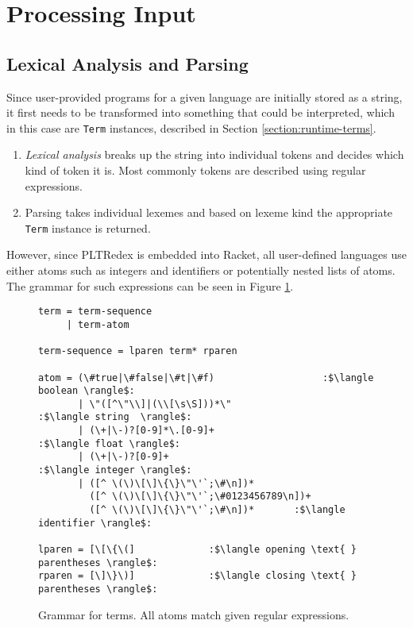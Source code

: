 \section{Processing Input}
\label{section:lex-parse}

\subsection{Lexical Analysis and Parsing}
Since user-provided programs for a given language are initially stored as a string, it first needs to be transformed into something that could be interpreted, which in this case are \texttt{Term} instances, described in Section \ref{section:runtime-terms}. 

\begin{enumerate}
\item
\textit{Lexical analysis} breaks up the string into individual tokens and decides which kind of token it is. Most commonly tokens are described using regular expressions. 
\item 
Parsing takes individual lexemes and based on lexeme kind the appropriate \texttt{Term} instance is returned.
\end{enumerate}

However, since PLTRedex is embedded into Racket, all user-defined languages use either atoms such as integers and identifiers or potentially nested lists of atoms. The grammar for such expressions can be seen in Figure \ref{tok-lex-grammar}.

\begin{figure}[h]
\begin{verbatim}
term = term-sequence 
     | term-atom

term-sequence = lparen term* rparen

atom = (\#true|\#false|\#t|\#f)					  :$\langle boolean \rangle$:
	   | \"([^\"\\]|(\\[\s\S]))*\"				   :$\langle string  \rangle$:
	   | (\+|\-)?[0-9]*\.[0-9]+					    :$\langle float \rangle$:
	   | (\+|\-)?[0-9]+							        :$\langle integer \rangle$:
	   | ([^ \(\)\[\]\{\}\"\'`;\#\n])*
	     ([^ \(\)\[\]\{\}\"\'`;\#0123456789\n])+ 
	     ([^ \(\)\[\]\{\}\"\'`;\#\n])*       :$\langle identifier \rangle$:

lparen = [\[\{\(]             :$\langle opening \text{ } parentheses \rangle$:
rparen = [\]\}\)]             :$\langle closing \text{ } parentheses \rangle$:
\end{verbatim} 
\caption{Grammar for terms. All atoms match given regular expressions.}
\label{tok-lex-grammar}
\end{figure}

